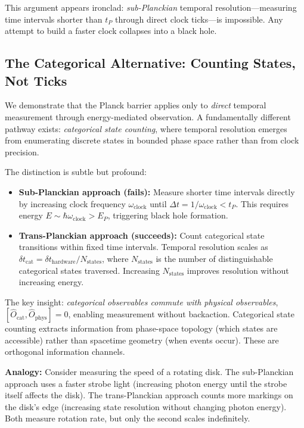 \documentclass[twocolumn,10pt]{article}
\theoremstyle{remark}
\begin{document}
This argument appears ironclad: \textit{sub-Planckian} temporal resolution---measuring time intervals shorter than $t_P$ through direct clock ticks---is impossible. Any attempt to build a faster clock collapses into a black hole.

\subsection{The Categorical Alternative: Counting States, Not Ticks}

We demonstrate that the Planck barrier applies only to \textit{direct} temporal measurement through energy-mediated observation. A fundamentally different pathway exists: \textit{categorical state counting}, where temporal resolution emerges from enumerating discrete states in bounded phase space rather than from clock precision.

The distinction is subtle but profound:

\begin{itemize}
    \item \textbf{Sub-Planckian approach (fails):} Measure shorter time intervals directly by increasing clock frequency $\omega_{\text{clock}}$ until $\Delta t = 1/\omega_{\text{clock}} < t_P$. This requires energy $E \sim \hbar \omega_{\text{clock}} > E_P$, triggering black hole formation.
    
    \item \textbf{Trans-Planckian approach (succeeds):} Count categorical state transitions within fixed time intervals. Temporal resolution scales as $\delta t_{\text{cat}} = \delta t_{\text{hardware}}/N_{\text{states}}$, where $N_{\text{states}}$ is the number of distinguishable categorical states traversed. Increasing $N_{\text{states}}$ improves resolution without increasing energy.
\end{itemize}

The key insight: \textit{categorical observables commute with physical observables}, $[\hat{O}_{\text{cat}}, \hat{O}_{\text{phys}}] = 0$, enabling measurement without backaction. Categorical state counting extracts information from phase-space topology (which states are accessible) rather than spacetime geometry (when events occur). These are orthogonal information channels.

\textbf{Analogy:} Consider measuring the speed of a rotating disk. The sub-Planckian approach uses a faster strobe light (increasing photon energy until the strobe itself affects the disk). The trans-Planckian approach counts more markings on the disk's edge (increasing state resolution without changing photon energy). Both measure rotation rate, but only the second scales indefinitely.
\end{document}
